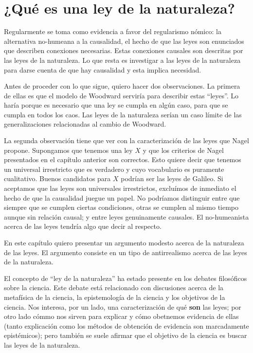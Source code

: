 \chapter{¿Qué es una ley de la naturaleza?}


\noindent Regularmente se toma como evidencia a favor del regularismo nómico: la alternativa no-humeana a la causalidad, el hecho de que las leyes son enunciados que describen conexiones necesarias. Estas conexiones causales son descritas por las leyes de la naturaleza. Lo que resta es investigar a las leyes de la naturaleza para darse cuenta de que hay causalidad y esta implica necesidad.

Antes de proceder con lo que sigue, quiero hacer dos observaciones. La primera de ellas es que el modelo de Woodward serviría para describir estas ``leyes''. Lo haría porque es necesario que una ley se cumpla en algún caso, para que se cumpla en todos los caos. Las leyes de la naturaleza serían un caso límite de las generalizaciones relacionadas al cambio de Woodward.

La segunda observación tiene que ver con la caracterización de las leyes que Nagel propone. Supongamos que tenemos una ley $X$ y que los criterios de Nagel presentados en el capítulo anterior son correctos. Esto quiere decir que tenemos un universal irrestricto que es verdadero y cuyo vocabulario es puramente cualitativo. Buenos candidatos para $X$ podrían ser las leyes de Galileo. Si aceptamos que las leyes son universales irrestrictos, excluímos de inmediato el hecho de que la causalidad juegue un papel. No podríamos distinguir entre que siempre que se cumplen ciertas condiciones, otras se cumplen al mismo tiempo aunque sin relación causal; y entre leyes genuinamente causales. El no-humeanista acerca de las leyes tendría algo que decir al respecto.

En este capítulo quiero presentar un argumento modesto acerca de la naturaleza de las leyes. El argumento consiste en un tipo de antirrealismo acerca de las leyes de la naturaleza.

El concepto de ``ley de la naturaleza'' ha estado presente en los debates filosóficos sobre la ciencia. Este debate está relacionado con discusiones acerca de la metafísica de la ciencia, la epistemología de la ciencia y los objetivos de la ciencia. Nos interesa, por un lado, una caracterización de qué \textbf{son} las leyes; por otro lado cómmo nos sirven para explicar y cómo obetnemos evidencia de ellas (tanto explicación como los métodos de obtención de evidencia son marcadamente epistémicos); pero también se suele afirmar que el objetivo de la ciencia es buscar las leyes de la naturaleza.

